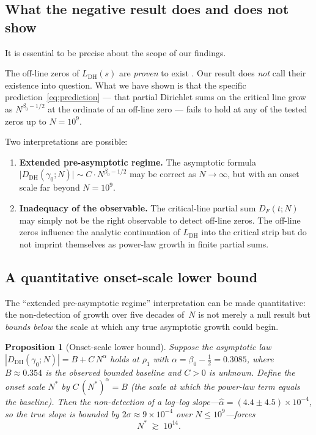 \documentclass[11pt]{amsart}
\newtheorem{proposition}[theorem]{Proposition}
\theoremstyle{definition}
\theoremstyle{remark}
\renewcommand{\DH}{\mathrm{DH}}
\newcommand{\abs}[1]{\lvert #1 \rvert}
\begin{document}
\subsection{What the negative result does and does not show}
\label{ssec:interpretations}

It is essential to be precise about the scope of our findings.

The off-line zeros of $L_{\DH}(s)$ are \emph{proven} to exist
\cite{DavenportHeilbronn1936, Spira1994, BalanzarioSanchezOrtiz2007}.
Our result does \emph{not} call their existence into question.  What
we have shown is that the specific prediction~\eqref{eq:prediction}
--- that partial Dirichlet sums on the critical line grow as
$N^{\beta_0 - 1/2}$ at the ordinate of an off-line zero --- fails
to hold at any of the tested zeros up to $N = 10^9$.

Two interpretations are possible:

\begin{enumerate}[label=(\alph*)]
\item \textbf{Extended pre-asymptotic regime.}  The asymptotic formula
  $\abs{D_{\DH}(\gamma_0; N)} \sim C \cdot N^{\beta_0 - 1/2}$ may
  be correct as $N \to \infty$, but with an onset scale far beyond
  $N = 10^9$.

\item \textbf{Inadequacy of the observable.}  The critical-line
  partial sum $D_F(t; N)$ may simply not be the right observable to
  detect off-line zeros.  The off-line zeros influence the analytic
  continuation of $L_{\DH}$ into the critical strip but do not
  imprint themselves as power-law growth in finite partial sums.
\end{enumerate}

\subsection{A quantitative onset-scale lower bound}\label{ssec:onset}

The ``extended pre-asymptotic regime'' interpretation can be made
quantitative: the non-detection of growth over five decades of~$N$ is not
merely a null result but \emph{bounds below} the scale at which any true
asymptotic growth could begin.

\begin{proposition}[Onset-scale lower bound]\label{prop:onset}
Suppose the asymptotic law $|D_{\DH}(\gamma_0;N)| = B + C\,N^{\alpha}$
holds at $\rho_1$ with $\alpha = \beta_0-\tfrac12 = 0.3085$, where
$B\approx0.354$ is the observed bounded baseline and $C>0$ is unknown.
Define the onset scale $N^*$ by $C\,(N^*)^{\alpha}=B$ (the scale at which
the power-law term equals the baseline). Then the non-detection of a
log--log slope---$\hat\alpha = (4.4\pm4.5)\times10^{-4}$, so the true
slope is bounded by $2\sigma\approx9\times10^{-4}$ over $N\le10^9$---forces
\begin{equation}\label{eq:onset}
  N^* \;\gtrsim\; 10^{14}.
\end{equation}
\end{proposition}
\end{document}

